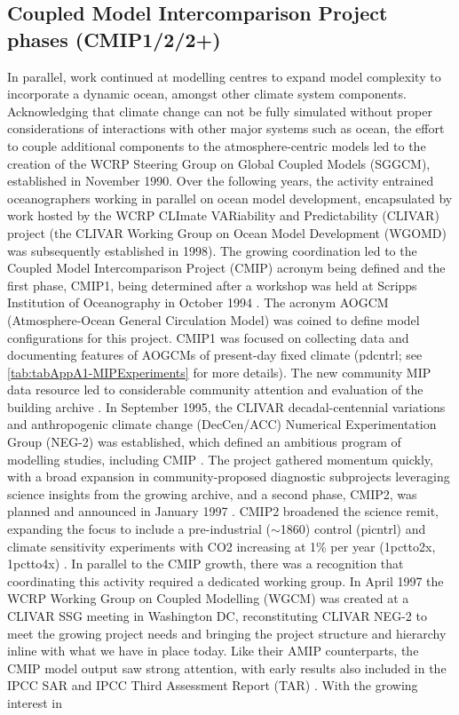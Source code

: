 \documentclass[gmd, preprint]{copernicus}
\begin{document}
\subsection{Coupled Model Intercomparison Project phases (CMIP1/2/2+)}
\label{sec:cmip1And2And2Plus}
In parallel, work continued at modelling centres to expand model complexity to incorporate a dynamic ocean, amongst other climate system components. Acknowledging that climate change can not be fully simulated without proper considerations of interactions with other major systems such as ocean, the effort to couple additional components to the atmosphere-centric models led to the creation of the WCRP Steering Group on Global Coupled Models (SGGCM), established in November 1990. Over the following years, the activity entrained oceanographers working in parallel on ocean model development, encapsulated by work hosted by the WCRP CLImate VARiability and Predictability (CLIVAR) project (the CLIVAR Working Group on Ocean Model Development (WGOMD) was subsequently established in 1998). The growing coordination led to the Coupled Model Intercomparison Project (CMIP) acronym being defined and the first phase, CMIP1, being determined after a workshop was held at Scripps Institution of Oceanography in October 1994 \citep{meehl_global_1995}. The acronym AOGCM (Atmosphere-Ocean General Circulation Model) was coined to define model configurations for this project. CMIP1 was focused on collecting data and documenting features of AOGCMs of present-day fixed climate (pdcntrl; see \autoref{tab:tabAppA1-MIPExperiments} for more details). The new community MIP data resource led to considerable community attention and evaluation of the building archive \citep{villwock_6th_2003, lambert_cmip1_2001, raisanen_co2-induced_2001}. In September 1995, the CLIVAR decadal-centennial variations and anthropogenic climate change (DecCen/ACC) Numerical Experimentation Group (NEG-2) was established, which defined an ambitious program of modelling studies, including CMIP \citep{villwock_what_1996, coughlan_report_1996}. The project gathered momentum quickly, with a broad expansion in community-proposed diagnostic subprojects leveraging science insights from the growing archive, and a second phase, CMIP2, was planned and announced in January 1997 \citep{meehl_intercomparison_1997, meehl_coupled_2000}. CMIP2 broadened the science remit, expanding the focus to include a pre-industrial ($\sim$1860) control (picntrl) and climate sensitivity experiments with CO2 increasing at 1\% per year (1pctto2x, 1pctto4x) \citep{villwock_6th_2003, meehl_cmip_2003}. In parallel to the CMIP growth, there was a recognition that coordinating this activity required a dedicated working group. In April 1997 the WCRP Working Group on Coupled Modelling (WGCM) was created at a CLIVAR SSG meeting in Washington DC, reconstituting CLIVAR NEG-2 to meet the growing project needs \citep{detemmerman_clivar_1997} and bringing the project structure and hierarchy inline with what we have in place today. Like their AMIP counterparts, the CMIP model output saw strong attention, with early results also included in the IPCC SAR \citep{gates_climate_1996} and IPCC Third Assessment Report (TAR) \citep{mcavaney_model_2001}. With the growing interest in 
\end{document}
